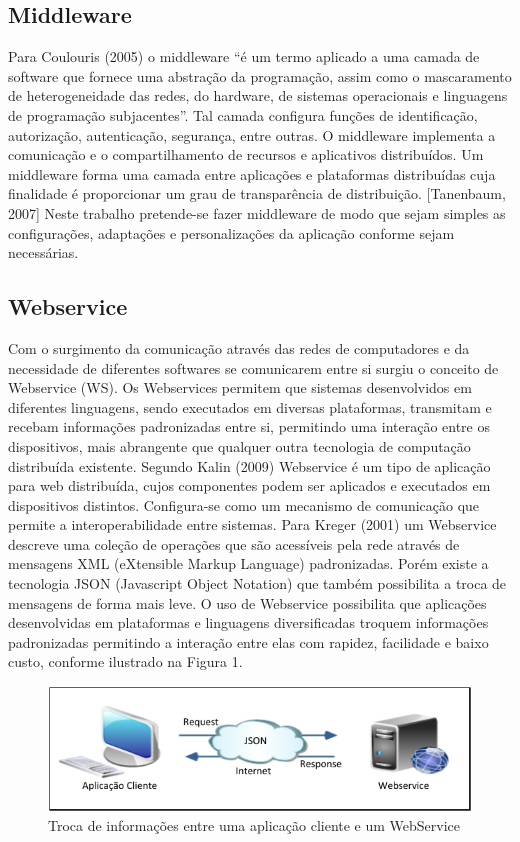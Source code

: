 \documentclass[12pt]{article}
\begin{document}
\subsection{Middleware}

Para Coulouris (2005) o middleware “é um termo aplicado a uma camada de software
que fornece uma abstração da programação, assim como o mascaramento de
heterogeneidade das redes, do hardware, de sistemas operacionais e linguagens de
programação subjacentes”. Tal camada configura funções de identificação, autorização,
autenticação, segurança, entre outras. O middleware implementa a comunicação e o
compartilhamento de recursos e aplicativos distribuídos.
Um middleware forma uma camada entre aplicações e plataformas distribuídas
cuja finalidade é proporcionar um grau de transparência de distribuição. [Tanenbaum,
2007]
Neste trabalho pretende-se fazer middleware de modo que sejam simples as
configurações, adaptações e personalizações da aplicação conforme sejam necessárias.

\subsection{Webservice}

Com o surgimento da comunicação através das redes de computadores e da necessidade
de diferentes softwares se comunicarem entre si surgiu o conceito de Webservice (WS).
Os Webservices permitem que sistemas desenvolvidos em diferentes linguagens,
sendo executados em diversas plataformas, transmitam e recebam informações
padronizadas entre si, permitindo uma interação entre os dispositivos, mais abrangente
que qualquer outra tecnologia de computação distribuída existente.
Segundo Kalin (2009) Webservice é um tipo de aplicação para web distribuída,
cujos componentes podem ser aplicados e executados em dispositivos distintos.
Configura-se como um mecanismo de comunicação que permite a interoperabilidade
entre sistemas. Para Kreger (2001) um Webservice descreve uma coleção de operações
que são acessíveis pela rede através de mensagens XML (eXtensible Markup Language)
padronizadas. Porém existe a tecnologia JSON (Javascript Object Notation) que
também possibilita a troca de mensagens de forma mais leve. O uso de Webservice
possibilita que aplicações desenvolvidas em plataformas e linguagens diversificadas
troquem informações padronizadas permitindo a interação entre elas com rapidez,
facilidade e baixo custo, conforme ilustrado na Figura 1.

\begin{figure}[ht]
	\centering
	\includegraphics[width=.8\textwidth]{figura1.png}
	\caption{Troca de informações entre uma aplicação cliente e um WebService}
	\label{fig:exampleFigura1}
\end{figure}
\end{document}
